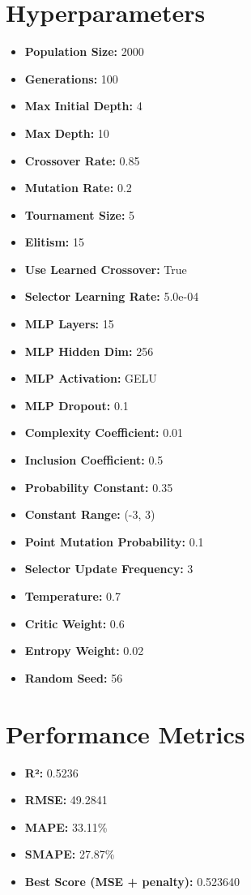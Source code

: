 \documentclass{article}
\begin{document}
\section*{Hyperparameters}
\begin{itemize}
\item \textbf{Population Size:} 2000
\item \textbf{Generations:} 100
\item \textbf{Max Initial Depth:} 4
\item \textbf{Max Depth:} 10
\item \textbf{Crossover Rate:} 0.85
\item \textbf{Mutation Rate:} 0.2
\item \textbf{Tournament Size:} 5
\item \textbf{Elitism:} 15
\item \textbf{Use Learned Crossover:} True
\item \textbf{Selector Learning Rate:} 5.0e-04
\item \textbf{MLP Layers:} 15
\item \textbf{MLP Hidden Dim:} 256
\item \textbf{MLP Activation:} GELU
\item \textbf{MLP Dropout:} 0.1
\item \textbf{Complexity Coefficient:} 0.01
\item \textbf{Inclusion Coefficient:} 0.5
\item \textbf{Probability Constant:} 0.35
\item \textbf{Constant Range:} (-3, 3)
\item \textbf{Point Mutation Probability:} 0.1
\item \textbf{Selector Update Frequency:} 3
\item \textbf{Temperature:} 0.7
\item \textbf{Critic Weight:} 0.6
\item \textbf{Entropy Weight:} 0.02
\item \textbf{Random Seed:} 56
\end{itemize}
\section*{Performance Metrics}
\begin{itemize}
\item \textbf{R²:} 0.5236
\item \textbf{RMSE:} 49.2841
\item \textbf{MAPE:} 33.11\%
\item \textbf{SMAPE:} 27.87\%
\item \textbf{Best Score (MSE + penalty):} 0.523640
\end{itemize}
\end{document}
